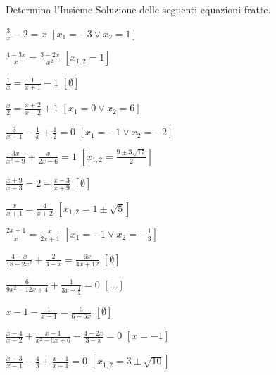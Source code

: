 \begin{esercizio}[\Ast]
\label{ese:3.39}
Determina l'Insieme Soluzione delle seguenti equazioni fratte.
\begin{multicols}{2}
\begin{enumeratea}
\item$\frac{3}{x}-2 = x$
  \hfill$\left[x_{1} =-3 \vee x_{2} = 1\right]$
\item$\frac{4-3 x}{x}=\frac{3-2 x}{x^{2}}$
  \hfill$\left[x_{1,2}= 1\right]$
\item$\frac{1}{x} = \frac{1}{x + 1}-1$
  \hfill$\left[\emptyset\right]$
\item$\frac{x}{2} = \frac{x + 2}{x-2} + 1$
  \hfill$\left[x_{1} = 0 \vee x_{2} = 6\right]$
\item$\frac{3}{x-1}-\frac{1}{x} + \frac{1}{2} = 0$
  \hfill$\left[x_{1} =-1 \vee x_{2} =-2\right]$
\item$\frac{3 x}{x^{2}-9} + \frac{x}{2 x-6}=1$
  \hfill$\left[x_{1,2} = \frac{9 \pm 3 \sqrt{17}}{2}\right]$
\item$\frac{x + 9}{x-3}=2-\frac{x-3}{x + 9}$
  \hfill$\left[\emptyset\right]$
\item$\frac{x}{x + 1} = \frac{4}{x + 2}$
  \hfill$\left[x_{1,2} = 1 \pm \sqrt{5}\right]$
\item$\frac{2 x + 1}{x} = \frac{x}{2 x + 1}$
  \hfill$\left[x_{1} =-1 \vee x_{2} =-\frac{1}{3}\right]$
\item$\frac{4-x}{18-2 x^{2}} + \frac{2}{3-x} = \frac{6 x}{4 x +12}$
  \hfill$\left[\emptyset\right]$
\item$\frac{6}{9 x^{2}-12 x + 4} + \frac{1}{3 x-\frac{1}{2}} =0$
  \hfill$\left[...\right]$
\item$x-1-\frac{1}{x-1} = \frac{6}{6-6 x}$
  \hfill$\left[\emptyset\right]$
\item$\frac{x-4}{x-2} + \frac{x-1}{x^{2}-5 x + 6}-\frac{4 -2 x}{3-x} = 0$
  \hfill$\left[x =-1\right]$
\item$\frac{x-3}{x-1}-\frac{4}{3} + \frac{x-1}{x + 1}=0$
  \hfill$\left[x_{1,2} = 3 \pm \sqrt{10}\right]$
\end{enumeratea}
\end{multicols}
\end{esercizio}

